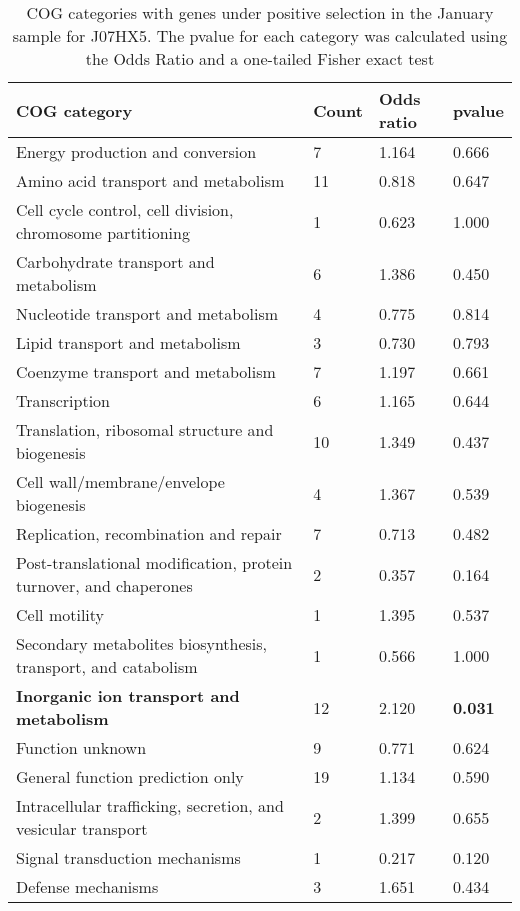 \clearpage
\begin{table}[]
\footnotesize 
	\tabcolsep=0.11cm 
\caption{COG categories with genes under positive selection in the January sample for J07HX5. The pvalue for each category was calculated using the Odds Ratio and a one-tailed Fisher exact test \\} 
\begin{tabularx}{\textwidth}{L{6cm}R{2cm}R{2cm}R{2cm}} 
\hline 
\textbf{COG category} & \textbf{Count} & \textbf{Odds ratio} & \textbf{pvalue} \\ 
\hline 
Energy production and conversion & 7 & 1.164 & 0.666 \\ 
Amino acid transport and metabolism & 11 & 0.818 & 0.647 \\ 
Cell cycle control, cell division, chromosome partitioning & 1 & 0.623 & 1.000 \\ 
Carbohydrate transport and metabolism & 6 & 1.386 & 0.450 \\ 
Nucleotide transport and metabolism & 4 & 0.775 & 0.814 \\ 
Lipid transport and metabolism & 3 & 0.730 & 0.793 \\ 
Coenzyme transport and metabolism & 7 & 1.197 & 0.661 \\ 
Transcription & 6 & 1.165 & 0.644 \\ 
Translation, ribosomal structure and biogenesis & 10 & 1.349 & 0.437 \\ 
Cell wall/membrane/envelope biogenesis & 4 & 1.367 & 0.539 \\ 
Replication, recombination and repair & 7 & 0.713 & 0.482 \\ 
Post-translational modification, protein turnover, and chaperones & 2 & 0.357 & 0.164 \\ 
Cell motility & 1 & 1.395 & 0.537 \\ 
Secondary metabolites biosynthesis, transport, and catabolism & 1 & 0.566 & 1.000 \\ 
\textbf{Inorganic ion transport and metabolism} & 12 & 2.120 & \textbf{0.031} \\ 
Function unknown & 9 & 0.771 & 0.624 \\ 
General function prediction only & 19 & 1.134 & 0.590 \\ 
Intracellular trafficking, secretion, and vesicular transport & 2 & 1.399 & 0.655 \\ 
Signal transduction mechanisms & 1 & 0.217 & 0.120 \\ 
Defense mechanisms & 3 & 1.651 & 0.434 \\ 
\end{tabularx} 
\label{January_COG_Selection_J07HX5} 
 \end{table} 

